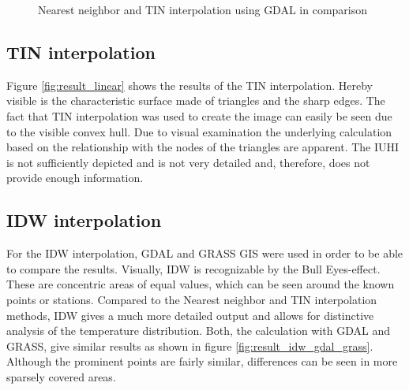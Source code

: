\begin{figure}
	\centering
	\hfill
	\caption{Nearest neighbor and TIN interpolation using GDAL in comparison}
	\label{fig:result_nearest_linear}
\end{figure}


\subsection{TIN interpolation}

Figure \ref{fig:result_linear} shows the results of the TIN interpolation. Hereby visible is the characteristic surface made of triangles and the sharp edges. The fact that TIN interpolation was used to create the image can easily be seen due to the visible convex hull. Due to visual examination the underlying calculation based on the relationship with the nodes of the triangles are apparent. The IUHI is not sufficiently depicted and is not very detailed and, therefore, does not provide enough information.


\subsection{IDW interpolation}

For the IDW interpolation, GDAL and GRASS GIS were used in order to be able to compare the results. Visually, IDW is recognizable by the \ldq{}Bull Eyes\rdq{}-effect. These are concentric areas of equal values, which can be seen around the known points or stations. Compared to the Nearest neighbor and TIN interpolation methods, IDW gives a much more detailed output and allows for distinctive analysis of the temperature distribution. Both, the calculation with GDAL and GRASS, give similar results as shown in figure \ref{fig:result_idw_gdal_grass}. Although the prominent points are fairly similar, differences can be seen in more sparsely covered areas.

